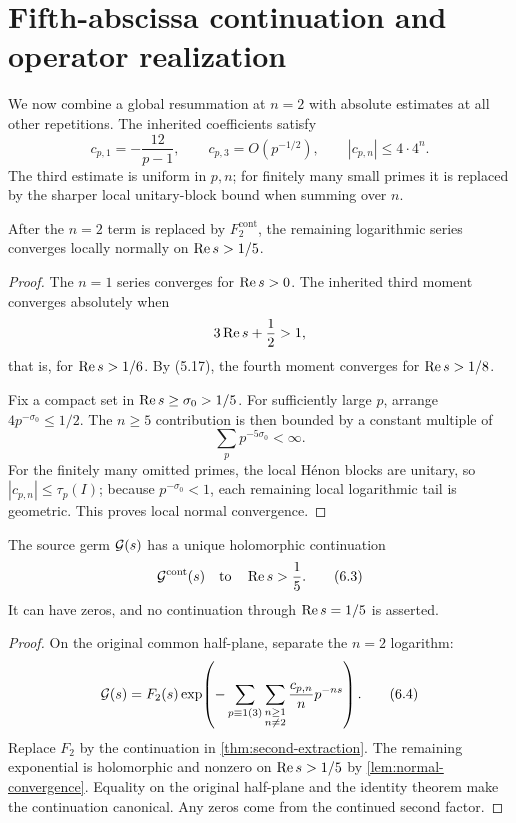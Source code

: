 \section{Fifth-abscissa continuation and operator realization}
\label{sec:continuation}

We now combine a global resummation at \(n=2\) with absolute estimates at
all other repetitions.  The inherited coefficients satisfy
\[
 c_{p,1}=-\frac{12}{p-1},\qquad
 c_{p,3}=O(p^{-1/2}),\qquad
 |c_{p,n}|\le4\cdot4^n.                                \tag{6.1}
\]
The third estimate is uniform in \(p,n\); for finitely many small primes it
is replaced by the sharper local unitary-block bound when summing over
\(n\).

\begin{lemma}\label{lem:normal-convergence}
After the \(n=2\) term is replaced by
\(F_2^{\mathrm{cont}}\), the remaining logarithmic series converges locally
normally on \(\operatorname{Re} s>1/5\).
\end{lemma}

\begin{proof}
The \(n=1\) series converges for \(\operatorname{Re} s>0\).  The inherited third
moment converges absolutely when
\[
 3\operatorname{Re} s+\frac12>1,
\]
that is, for \(\operatorname{Re} s>1/6\).  By (5.17), the fourth moment converges for
\(\operatorname{Re} s>1/8\).

Fix a compact set in \(\operatorname{Re} s\ge\sigma_0>1/5\).  For sufficiently large
\(p\), arrange \(4p^{-\sigma_0}\le1/2\).  The \(n\ge5\) contribution is
then bounded by a constant multiple of
\[
 \sum_p p^{-5\sigma_0}<\infty.                         \tag{6.2}
\]
For the finitely many omitted primes, the local H\'enon blocks are unitary,
so \(|c_{p,n}|\le\tau_p(I)\); because \(p^{-\sigma_0}<1\), each remaining
local logarithmic tail is geometric.  This proves local normal convergence.
\end{proof}

\begin{theorem}\label{thm:continuation}
The source germ \(\mathcal G(s)\) has a unique holomorphic continuation
\[
 \mathcal G^{\mathrm{cont}}(s)
 \quad\text{to}\quad \operatorname{Re} s>\frac15.                 \tag{6.3}
\]
It can have zeros, and no continuation through \(\operatorname{Re} s=1/5\) is
asserted.
\end{theorem}

\begin{proof}
On the original common half-plane, separate the \(n=2\) logarithm:
\[
 \mathcal G(s)=F_2(s)
 \exp\!\left(
 -\sum_{p\equiv1(3)}
  \sum_{\substack{n\ge1\\n\ne2}}
  \frac{c_{p,n}}n p^{-ns}
 \right).                                               \tag{6.4}
\]
Replace \(F_2\) by the continuation in
\cref{thm:second-extraction}.  The remaining exponential is holomorphic and
nonzero on \(\operatorname{Re} s>1/5\) by
\cref{lem:normal-convergence}.  Equality on the original half-plane and the
identity theorem make the continuation canonical.  Any zeros come from the
continued second factor.
\end{proof}

